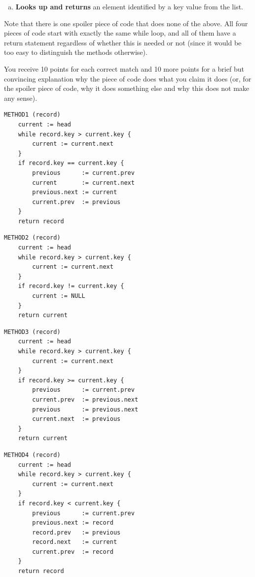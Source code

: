 \documentclass{jn-pset}
\begin{document}
\begin{problem}
\begin{enumerate}[(a)]
  \item
    \textbf{Looks up and returns}
    an element
    identified by a key value
    from the list.

  \end{enumerate}
  Note that there is one spoiler piece of code that does none of the
  above.
  All four pieces of code start with exactly the same while loop,
  and all of them have a return statement regardless of whether
  this is needed or not (since it would be too easy to
  distinguish the methods otherwise).

  You receive 10 points for each correct match and 10 more
  points for a brief but convincing explanation why the piece of code
  does what you claim it does (or, for the spoiler piece of code, why it
  does something else and why this does not make any sense).

\begin{verbatim}
METHOD1 (record) 
    current := head
    while record.key > current.key {
        current := current.next
    }
    if record.key == current.key {
        previous      := current.prev
        current       := current.next
        previous.next := current
        current.prev  := previous
    }
    return record
\end{verbatim}

\begin{verbatim}
METHOD2 (record) 
    current := head
    while record.key > current.key {
        current := current.next
    }
    if record.key != current.key {
        current := NULL
    }
    return current
\end{verbatim}


\begin{verbatim}
METHOD3 (record) 
    current := head
    while record.key > current.key {
        current := current.next
    }
    if record.key >= current.key {
        previous      := current.prev
        current.prev  := previous.next
        previous      := previous.next
        current.next  := previous
    }
    return current
\end{verbatim}

\begin{verbatim}
METHOD4 (record) 
    current := head
    while record.key > current.key {
        current := current.next
    }
    if record.key < current.key {
        previous      := current.prev
        previous.next := record
        record.prev   := previous
        record.next   := current
        current.prev  := record
    }
    return record
\end{verbatim}




\end{problem}
\end{document}
